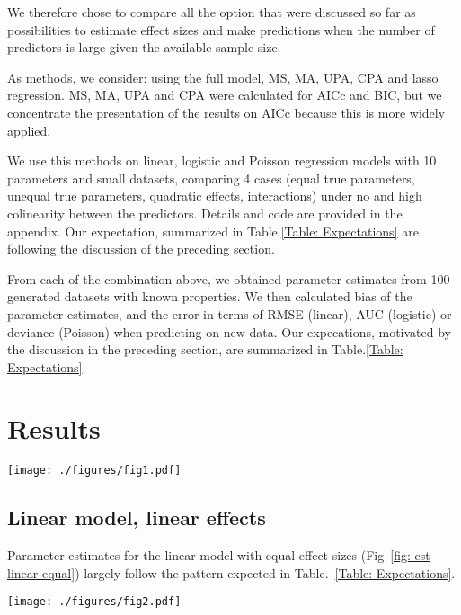 \documentclass[5p]{elsarticle}
\begin{document}
We therefore chose to compare all the option that were discussed so far as possibilities to estimate effect sizes and make predictions when the number of predictors is large given the available sample size. 

As methods, we consider: using the full model, MS, MA, UPA, CPA and lasso regression. MS, MA, UPA and CPA were calculated for AICc and BIC, but we concentrate the presentation of the results on AICc because this is more widely applied. 

We use this methods on linear, logistic and Poisson regression models with 10 parameters and small datasets, comparing 4 cases (equal true parameters, unequal true parameters, quadratic effects, interactions) under no and high colinearity between the predictors. Details and code are provided in the appendix. Our expectation, summarized in Table.\ref{Table: Expectations} are following the discussion of the preceding section. 

From each of the combination above, we obtained parameter estimates from 100 generated datasets with known properties. We then calculated bias of the parameter estimates, and the error in terms of RMSE (linear), AUC (logistic) or deviance (Poisson) when predicting on new data. Our expecations, motivated by the discussion in the preceding section, are summarized in Table.\ref{Table: Expectations}.



\section{Results}

\begin{figure*}\label{fig: est linear equal}
\texttt{[image: ./figures/fig1.pdf]}
\caption{Bias of parameter estimates for linear regressions with independent (left) and colinear predictors.}
\end{figure*}



\subsection{Linear model, linear effects} 

Parameter estimates for the linear model with equal effect sizes (Fig~\ref{fig: est linear equal}) largely follow the pattern expected in Table.~\ref{Table: Expectations}.

\begin{figure*}\label{fig: err linear equal}
\texttt{[image: ./figures/fig2.pdf]}
\caption{Predictive error of parameter estimates for linear regressions with independent (left) and colinear predictors.}
\end{figure*}
\end{document}
